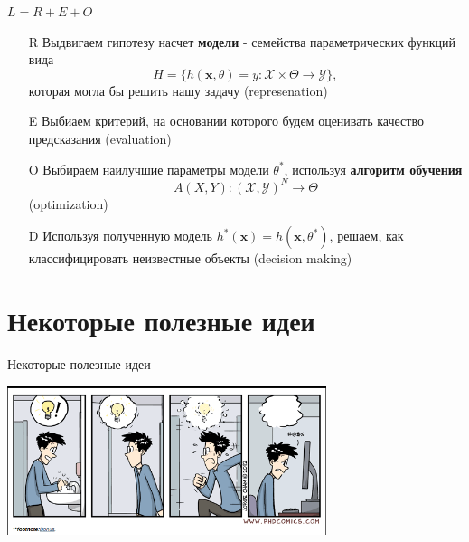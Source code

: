 \documentclass[aspectratio=169]{beamer}
\begin{document}
\begin{frame}{$L = R + E + O$}

\begin{enumerate}

\item[R] Выдвигаем гипотезу насчет {\bf модели} - семейства параметрических функций вида
\[
H = \{h(\mathbf{x}, \theta) = y: \mathcal{X} \times \Theta \rightarrow \mathcal{Y} \},
\]
которая могла бы решить нашу задачу (represenation)

\item[E] Выбиаем критерий, на основании которого будем оценивать качество предсказания (evaluation)

\item[O] Выбираем наилучшие параметры модели $\theta^*$, используя {\bf алгоритм обучения}
\[
A(X, Y) : (\mathcal{X}, \mathcal{Y})^N \rightarrow \Theta
\]
(optimization)

\item[D] Используя полученную модель $h^*(\mathbf{x}) = h(\mathbf{x}, \theta^*)$, решаем, как классифицировать неизвестные объекты (decision making)

\end{enumerate}

\end{frame}

\section{Некоторые полезные идеи}

\begin{frame}{}

\begin{center}
\Large Некоторые полезные идеи

\vspace{1em}
\includegraphics[width=0.7\textwidth]{images/idea.png}
\end{center}

\end{frame}
\end{document}
